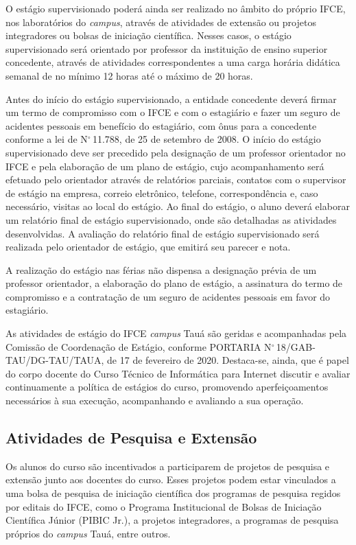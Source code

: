\documentclass[
	12pt,				%
	openright,			%
	twoside,			%
	a4paper,			%
	chapter=TITLE,		%
	english,			%
	french,				%
	spanish,			%
	brazil,				%
	]{abntex2}
\begin{document}
O estágio supervisionado poderá ainda ser realizado no âmbito do próprio IFCE, nos laboratórios do \textit{campus}, através de atividades de extensão ou projetos integradores ou bolsas de iniciação científica. Nesses casos, o estágio supervisionado será orientado por professor da instituição de ensino superior concedente, através de atividades correspondentes a uma carga horária didática semanal de no mínimo 12 horas até o máximo de 20 horas.

Antes do início do estágio supervisionado, a entidade concedente deverá firmar um termo de compromisso com o IFCE e com o estagiário e fazer um seguro de acidentes pessoais em benefício do estagiário, com ônus para a concedente conforme a lei de N$^\circ$\,11.788, de 25 de setembro de 2008. O início do estágio supervisionado deve ser precedido pela designação de um professor orientador no IFCE e pela elaboração de um plano de estágio, cujo acompanhamento será efetuado pelo orientador através de relatórios parciais, contatos com o supervisor de estágio na empresa, correio eletrônico, telefone, correspondência e, caso necessário, visitas ao local do estágio. Ao final do estágio, o aluno deverá elaborar um relatório final de estágio supervisionado, onde são detalhadas as atividades desenvolvidas. A avaliação do relatório final de estágio supervisionado será realizada pelo orientador de estágio, que emitirá seu parecer e nota. 

A realização do estágio nas férias não dispensa a designação prévia de um
professor orientador, a elaboração do plano de estágio, a assinatura do termo de compromisso e a contratação de um seguro de acidentes pessoais em favor do estagiário.

As atividades de estágio do IFCE \textit{campus} Tauá são geridas e acompanhadas pela Comissão de Coordenação de Estágio, conforme  PORTARIA N$^\circ$\,18/GAB-TAU/DG-TAU/TAUA, de 17 de fevereiro de 2020. Destaca-se, ainda, que é papel do corpo docente do Curso Técnico de Informática para Internet discutir e avaliar continuamente a política de estágios do curso, promovendo aperfeiçoamentos necessários à sua execução, acompanhando e avaliando a sua operação.


\subsection{Atividades de Pesquisa e Extensão}
Os alunos do curso são incentivados a participarem de projetos de pesquisa e extensão junto aos docentes do curso. Esses projetos podem estar vinculados a uma bolsa de pesquisa de iniciação científica dos programas de pesquisa regidos por editais do IFCE, como o  Programa Institucional de Bolsas de Iniciação Científica Júnior (PIBIC Jr.), a projetos integradores, a programas de pesquisa próprios do \textit{campus} Tauá, entre outros. 
\end{document}
